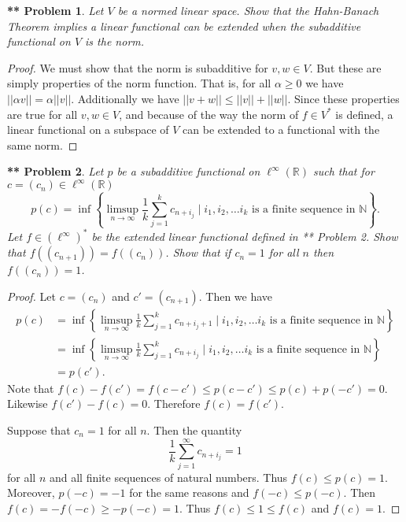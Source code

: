 \documentclass{article}
\newtheorem{**}{** Problem}
\begin{document}
\begin{flushleft}
\begin{**}
Let $V$ be a normed linear space. Show that the Hahn-Banach Theorem implies a linear functional can be extended when the subadditive functional on $V$ is the norm.
\end{**}
\begin{proof}
We must show that the norm is subadditive for $v, w \in V$. But these are simply properties of the norm function. That is, for all $\alpha \geq 0$ we have $||\alpha v|| = \alpha ||v||$. Additionally we have $||v + w|| \leq ||v|| + ||w||$. Since these properties are true for all $v, w \in V$, and because of the way the norm of $f \in V^*$ is defined, a linear functional on a subspace of $V$ can be extended to a functional with the same norm.
\end{proof}

\begin{**}
Let $p$ be a subadditive functional on $\ell^{\infty}(\mathbb{R})$ such that for $c = (c_n) \in \ell^{\infty} (\mathbb{R})$
\[
p(c) = \inf \left \{ \limsup_{n \rightarrow \infty} \frac{1}{k} \sum_{j=1}^{k} c_{n+i_j} \mid i_1, i_2, \dots i_k \text{ is a finite sequence in $\mathbb{N}$} \right \}.
\]
Let $f \in (\ell^{\infty})^*$ be the extended linear functional defined in ** Problem 2. Show that $f((c_{n+1})) = f((c_n))$. Show that if $c_n = 1$ for all $n$ then $f((c_n)) = 1$. 
\end{**}
\begin{proof}
Let $c = (c_n)$ and $c' = (c_{n+1})$. Then we have
\begin{align*}
p(c)
&= \inf \left \{ \limsup_{n \rightarrow \infty} \frac{1}{k} \sum_{j=1}^{k} c_{n+i_j+1} \mid i_1, i_2, \dots i_k \text{ is a finite sequence in $\mathbb{N}$} \right \}\\
&= \inf \left \{ \limsup_{n \rightarrow \infty} \frac{1}{k} \sum_{j=1}^{k} c_{n+i_j} \mid i_1, i_2, \dots i_k \text{ is a finite sequence in $\mathbb{N}$} \right \}\\
&= p(c').
\end{align*}
Note that $f(c) - f(c') = f(c-c') \leq p(c-c') \leq p(c) + p(-c') = 0$. Likewise $f(c') - f(c) = 0$. Therefore $f(c) = f(c')$.

Suppose that $c_n = 1$ for all $n$. Then the quantity
\[
\frac{1}{k} \sum_{j=1}^{\infty} c_{n+i_j} = 1
\]
for all $n$ and all finite sequences of natural numbers. Thus $f(c) \leq p(c) = 1$. Moreover, $p(-c) = -1$ for the same reasons and $f(-c) \leq p(-c)$. Then $f(c) = -f(-c) \geq -p(-c) = 1$. Thus $f(c) \leq 1 \leq f(c)$ and $f(c) = 1$.
\end{proof}


\end{flushleft}
\end{document}
